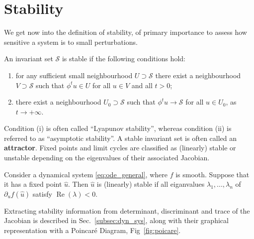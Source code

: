 \tocless\section{Stability}
\label{sec:formal_stability}
We get now into the definition of stability, of primary importance to assess how sensitive a system is to small perturbations.
\begin{theorem}
	An invariant set $\mathcal{S}$ is stable if the following conditions hold:
	\renewcommand{\theenumi}{\roman{enumi}}%
	\begin{enumerate}
		\item for any sufficient small neighbourhood $U \supset \mathcal{S}$ there exist a neighbourhood $V \supset \mathcal{S}$ such that $\phi^tu \in U$ for all $u \in V$ and all $t>0$;
		\item there exist a neighbourhood $U_0 \supset \mathcal{S}$ such that $\phi^tu \to \mathcal{S}$ for all $u \in U_0$, as $t \to +\infty$.
	\end{enumerate}
	\label{theorem:stability}
\end{theorem}
Condition (i) is often called ``Lyapunov stability'', whereas condition (ii) is referred to as ``asymptotic stability''.
A stable invariant set is often called an \textbf{attractor}.
Fixed points and limit cycles are classified as (linearly) stable or unstable depending on the eigenvalues of their associated Jacobian.
\begin{theorem}
	Consider a dynamical system \ref{eq:ode_general}, where $f$ is smooth. Suppose that it has a fixed point $\hat{u}$. Then $\hat{u}$  is (linearly) stable if all eiganvalues $\lambda_1, ..., \lambda_n$ of $\partial_u f(\hat{u})$ satisfy $\operatorname{Re}(\lambda) < 0$.
	\label{theorem:linear_stability}
\end{theorem}

Extracting stability information from determinant, discriminant and trace of the Jacobian is described in Sec.~\ref{subsec:dyn_sys}, along with their graphical representation with a Poincar\'e Diagram, Fig~\ref{fig:poicare}. 







